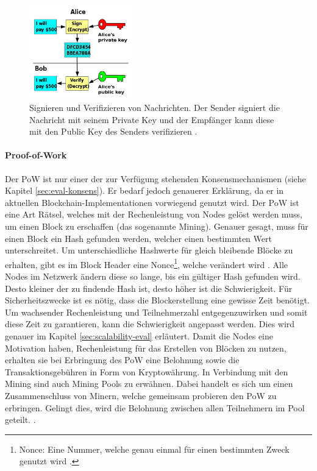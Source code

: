 \begin{figure}[!htbp]
	\centering
	  \includegraphics[width=0.4\textwidth,angle=0]{images/key-signing}
	  \caption{Signieren und Verifizieren von Nachrichten. Der Sender signiert die Nachricht mit seinem Private Key und der Empfänger kann diese mit den Public Key des Senders verifizieren \cite{WikimediaCommonsPublickeysigning2006}.}
	  \label{fig:key-signing}
\end{figure}
	
\paragraph{Proof-of-Work}
Der \acs{PoW} ist nur einer der zur Verfügung stehenden Konsensmechanismen (siehe Kapitel \ref{sec:eval-konsens}). Er bedarf jedoch genauerer Erklärung, da er in aktuellen Blockchain-Implementationen vorwiegend genutzt wird. Der \acs{PoW} ist eine Art Rätsel, welches mit der Rechenleistung von Nodes gelöst werden muss, um einen Block zu erschaffen (das sogenannte Mining). Genauer gesagt, muss für einen Block ein Hash gefunden werden, welcher einen bestimmten Wert unterschreitet. Um unterschiedliche Hashwerte für gleich bleibende Blöcke zu erhalten, gibt es im Block Header eine Nonce\footnote{Nonce: Eine Nummer, welche genau einmal für einen bestimmten Zweck genutzt wird \cite{MargaretNonceDefinition}.}, welche verändert wird \cite{NakamotoBitcoinPeertoPeerElectronic2008}. Alle Nodes im Netzwerk ändern diese so lange, bis ein gültiger Hash gefunden wird. Desto kleiner der zu findende Hash ist, desto höher ist die Schwierigkeit. Für Sicherheitszwecke ist es nötig, dass die Blockerstellung eine gewisse Zeit benötigt. Um wachsender Rechenleistung und Teilnehmerzahl entgegenzuwirken und somit diese Zeit zu garantieren, kann die Schwierigkeit angepasst werden. Dies wird genauer im Kapitel \ref{sec:scalability-eval} erläutert. Damit die Nodes eine Motivation haben, Rechenleistung für das Erstellen von Blöcken zu nutzen, erhalten sie bei Erbringung des \acs{PoW} eine Belohnung sowie die Transaktionsgebühren in Form von Kryptowährung. In Verbindung mit den Mining sind auch Mining Pools zu erwähnen. Dabei handelt es sich um einen Zusammenschluss von Minern, welche gemeinsam probieren den \acs{PoW} zu erbringen. Gelingt dies, wird die Belohnung zwischen allen Teilnehmern im Pool geteilt.  \cite{NakamotoBitcoinPeertoPeerElectronic2008} \cite{EthereumTeamEthereumWhitePaper2017}. 

